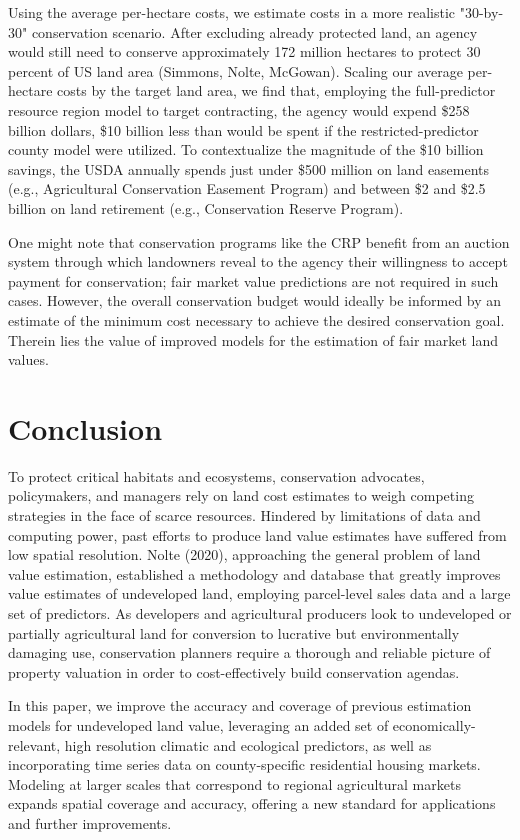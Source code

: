 \documentclass[12pt]{article}
\begin{document}
Using the average per-hectare costs, we estimate costs in a more realistic "30-by-30" conservation scenario. After excluding already protected land, an agency would still need to conserve approximately 172 million hectares to protect 30 percent of US land area (Simmons, Nolte, McGowan). Scaling our average per-hectare costs by the target land area, we find that, employing the full-predictor resource region model to target contracting, the agency would expend \$258 billion dollars, \$10 billion less than would be spent if the restricted-predictor county model were utilized. To contextualize the magnitude of the \$10 billion savings, the USDA annually spends just under \$500 million on land easements (e.g., Agricultural Conservation Easement Program) and between \$2 and \$2.5 billion on land retirement (e.g., Conservation Reserve Program).

One might note that conservation programs like the CRP benefit from an auction system through which landowners reveal to the agency their willingness to accept payment for conservation; fair market value predictions are not required in such cases. However, the overall conservation budget would ideally be informed by an estimate of the minimum cost necessary to achieve the desired conservation goal. Therein lies the value of improved models for the estimation of fair market land values. 

\section{Conclusion}

To protect critical habitats and ecosystems, conservation advocates, policymakers, and managers rely on land cost estimates to weigh competing strategies in the face of scarce resources. Hindered by limitations of data and computing power, past efforts to produce land value estimates have suffered from low spatial resolution. Nolte (2020), approaching the general problem of land value estimation, established a methodology and database that greatly improves value estimates of undeveloped land, employing parcel-level sales data and a large set of predictors. As developers and agricultural producers look to undeveloped or partially agricultural land for conversion to lucrative but environmentally damaging use, conservation planners require a thorough and reliable picture of property valuation in order to cost-effectively build conservation agendas.

In this paper, we improve the accuracy and coverage of previous estimation models for undeveloped land value, leveraging an added set of economically-relevant, high resolution climatic and ecological predictors, as well as incorporating time series data on county-specific residential housing markets. Modeling at larger scales that correspond to regional agricultural markets expands spatial coverage and accuracy, offering a new standard for applications and further improvements. 
\end{document}
